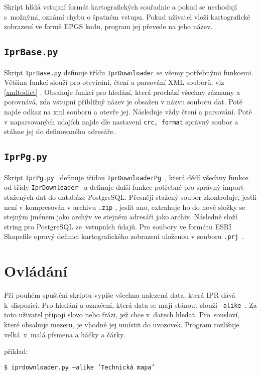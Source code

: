 Skript hlídá vstupní formát kartografických souřadnic a pokud se neshodují
s~možnými, oznámí chybu o špatném vstupu. Pokud uživatel vloží kartografické
zobrazení ve formě EPGS kodu, program jej převede na jeho název.


\subsection{{\tt IprBase.py}}
Skript {\tt IprBase.py} definuje třídu {\tt IprDownloader} se všemy 
potřebnými funkcemi. Většina funkcí slouží pro otevírání, čtení a parsování
XML souborů, viz \ref{xmltodict} .
Obsahuje funkci pro hledání, která prochází všechny záznamy a 
porovnává, zda vstupní přibližný název je obsažen v názvu souboru dat. Poté 
najde odkaz na xml souboru a otevře jej. Následuje vždy čtení a parsování. 
Poté v naparsovaných udajích najde dle nastavení {\tt crc, format} správný soubor 
a stáhne jej do definovaného adresáře.


\subsection{{\tt IprPg.py}}
Skript {\tt IprPg.py } definuje třídou {\tt IprDownloaderPg }, která dědí 
všechny funkce od třídy {\tt IprDownloader } a definuje další funkce potřebné pro 
správný import stažených dat do databáze PostgreSQL. 
Přesněji stažený soubor zkontroluje, jestli není v kompresován v archivu 
{\tt *.zip} , jeslit ano, extrahuje ho do nové složky se stejným jménem jako
archýv ve stejném adresáři jako archiv. Následně složí string pro PostgreSQL 
ze~vstupních údajů. Pro soubory ve formátu ESRI Shapefile opravý definici 
kartografického zobrazení uloženou v souboru {\tt *.prj }. 


\section{Ovládání}
Při pouhém spuštění skriptu vypíše všechna nalezená data, která IPR dává 
k~dispozici. Pro hledání a označení, která data se mají stánout slouží 
{\tt ---alike }. Za toto uživatel připojí slovo nebo frázi, jež chce v~datech
hledat. Pro~sousloví, které obsahuje mezeru, je vhodné jej umístit do uvozovek. 
Program rozlišuje velká~x~malá písmena a háčky a čárky.

příklad:

{\tt \$ iprdownloader.py ---alike 'Technická mapa'}
  

